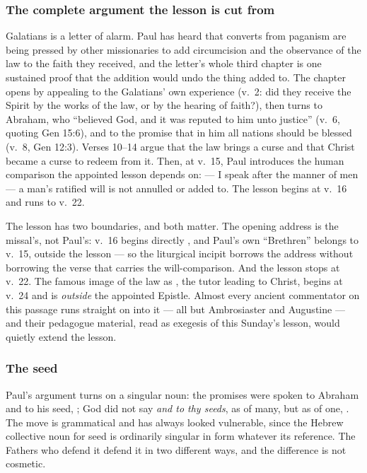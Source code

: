 \subsubsection*{The complete argument the lesson is cut from}

Galatians is a letter of alarm. Paul has heard that converts from paganism are
being pressed by other missionaries to add circumcision and the observance of
the law to the faith they received, and the letter's whole third chapter is
one sustained proof that the addition would undo the thing added to. The
chapter opens by appealing to the Galatians' own experience (v.~2: did they
receive the Spirit by the works of the law, or by the hearing of faith?), then
turns to Abraham, who ``believed God, and it was reputed to him unto justice''
(v.~6, quoting Gen 15:6), and to the promise that in him all nations should be
blessed (v.~8, Gen 12:3). Verses 10--14 argue that the law brings a curse and
that Christ became a curse to redeem from it. Then, at v.~15, Paul introduces
the human comparison the appointed lesson depends on:  --- I speak after the manner of men --- a man's ratified will is not
annulled or added to. The lesson begins at v.~16 and runs to v.~22.

The lesson has two boundaries, and both matter. The opening address
 is the missal's, not Paul's: v.~16 begins directly
, and Paul's own ``Brethren'' belongs to
v.~15, outside the lesson --- so the liturgical incipit borrows the address
without borrowing the verse that carries the will-comparison. And the lesson
stops at v.~22. The famous image of the law as , the tutor leading to Christ, begins at v.~24 and is \textit{outside}
the appointed Epistle. Almost every ancient commentator on this passage runs
straight on into it --- all but Ambrosiaster and Augustine --- and their
pedagogue material, read as exegesis of this Sunday's lesson, would quietly
extend the lesson.

\subsubsection*{The seed}

Paul's argument turns on a singular noun: the promises were spoken to Abraham
and to his seed, ; God did not say \textit{and to thy
seeds}, as of many, but as of one, .
The move is grammatical and has always looked vulnerable, since the Hebrew
collective noun for seed is ordinarily singular in form whatever its
reference. The Fathers who defend it defend it in two different ways, and the
difference is not cosmetic.

